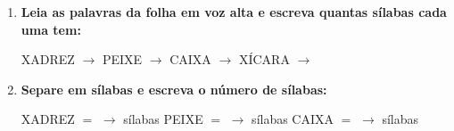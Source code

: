 \begin{exercicio}
\begin{enumerate}[resume]
  \item \textbf{Leia as palavras da folha em voz alta e escreva quantas sílabas cada uma tem:}

  \begin{center}
  XADREZ $\rightarrow$ \underline{\hspace{1cm}} \quad PEIXE $\rightarrow$ \underline{\hspace{1cm}} \quad CAIXA $\rightarrow$ \underline{\hspace{1cm}} \quad XÍCARA $\rightarrow$ \underline{\hspace{1cm}}
  \end{center}

  \item \textbf{Separe em sílabas e escreva o número de sílabas:}
  \begin{center}
  XADREZ $=$ \underline{\hspace{1.2cm}} $\rightarrow$ \underline{\hspace{0.8cm}} sílabas \quad PEIXE $=$ \underline{\hspace{1.2cm}} $\rightarrow$ \underline{\hspace{0.8cm}} sílabas \quad CAIXA $=$ \underline{\hspace{1.2cm}} $\rightarrow$ \underline{\hspace{0.8cm}} sílabas
  \end{center}

\end{enumerate}

\end{exercicio}



